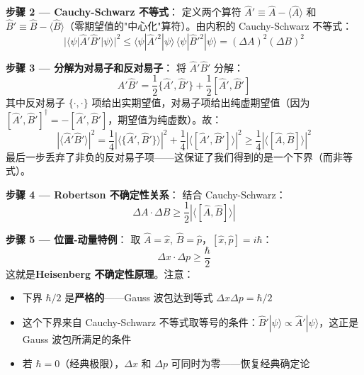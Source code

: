 \textbf{步骤 2 — Cauchy-Schwarz 不等式}：\fbox{[S]} 定义两个算符 $\hat{A}' \equiv \hat{A} - \langle\hat{A}\rangle$ 和 $\hat{B}' \equiv \hat{B} - \langle\hat{B}\rangle$（零期望值的"中心化"算符）。由内积的 Cauchy-Schwarz 不等式：
\begin{equation}
|\langle\psi|\hat{A}'\hat{B}'|\psi\rangle|^2 \le \langle\psi|\hat{A}'^2|\psi\rangle\,\langle\psi|\hat{B}'^2|\psi\rangle
= (\Delta A)^2 (\Delta B)^2
\end{equation}

\textbf{步骤 3 — 分解为对易子和反对易子}：\fbox{[S]} 将 $\hat{A}'\hat{B}'$ 分解：
\begin{equation}
\hat{A}'\hat{B}' = \frac{1}{2}\{\hat{A}',\hat{B}'\} + \frac{1}{2}[\hat{A}',\hat{B}']
\end{equation}
其中反对易子 $\{\cdot,\cdot\}$ 项给出实期望值，对易子项给出纯虚期望值（因为 $[\hat{A}',\hat{B}']^\dagger = -[\hat{A}',\hat{B}']$，期望值为纯虚数）。故：
\begin{equation}
|\langle\hat{A}'\hat{B}'\rangle|^2 = \frac{1}{4}|\langle\{\hat{A}',\hat{B}'\}\rangle|^2 + \frac{1}{4}|\langle[\hat{A}',\hat{B}']\rangle|^2
\ge \frac{1}{4}|\langle[\hat{A},\hat{B}]\rangle|^2
\end{equation}
\fbox{[N]} 最后一步丢弃了非负的反对易子项——这保证了我们得到的是一个下界（而非等式）。

\textbf{步骤 4 — Robertson 不确定性关系}：\fbox{[S]} 结合 Cauchy-Schwarz：
\begin{equation}
\boxed{\Delta A \cdot \Delta B \ge \frac{1}{2}|\langle[\hat{A},\hat{B}]\rangle|}
\end{equation}

\textbf{步骤 5 — 位置-动量特例}：\fbox{[S]} 取 $\hat{A} = \hat{x}$, $\hat{B} = \hat{p}$，$[\hat{x},\hat{p}] = i\hbar$：
\begin{equation}
\boxed{\Delta x \cdot \Delta p \ge \frac{\hbar}{2}}
\end{equation}
\fbox{[N]}\fbox{[S]} 这就是\textbf{Heisenberg 不确定性原理}。注意：
\begin{itemize}
\item 下界 $\hbar/2$ 是\textbf{严格的}——Gauss 波包达到等式 $\Delta x\Delta p = \hbar/2$
\item 这个下界来自 Cauchy-Schwarz 不等式取等号的条件：$\hat{B}'|\psi\rangle \propto \hat{A}'|\psi\rangle$，这正是 Gauss 波包所满足的条件
\item 若 $\hbar = 0$（经典极限），$\Delta x$ 和 $\Delta p$ 可同时为零——恢复经典确定论
\end{itemize}

